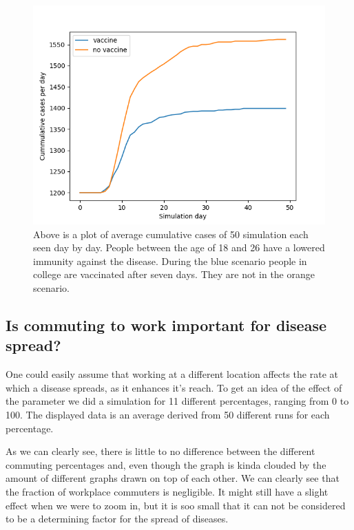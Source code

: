 \documentclass[runningheads]{llncs}
\begin{document}
	\begin{figure}[h!]
		\includegraphics[width=\textwidth]{student_vaccinations.png}
		\caption{Above is a plot of average cumulative cases of 50 simulation each seen day by day. People between the age of 18 and 26 have a lowered immunity against the disease. During the blue scenario people in college are vaccinated after seven days. They are not in the orange scenario.}
		\label{vax_campus}
	\end{figure}
	\clearpage
	
	\subsection{Is commuting to work important for disease spread?}
	One could easily assume that working at a different location affects the rate at which a disease spreads, as it enhances it's reach. To get an idea of the effect of the parameter we did a simulation for 11 different percentages, ranging from 0 to 100. The displayed data is an average derived from 50 different runs for each percentage.
	
	
	\noindent
	As we can clearly see, there is little to no difference between the different commuting percentages and, even though the graph is kinda clouded by the amount of different graphs drawn on top of each other. We can clearly see that the fraction of workplace commuters is negligible. It might still have a slight effect when we were to zoom in, but it is soo small that it can not be considered to be a determining factor for the spread of diseases. 
	\newpage
\end{document}
